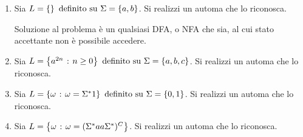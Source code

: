 \documentclass{subfiles}
\begin{document}
\begin{enumerate}
    \item Sia \(L = \Set{} \text{definito su} \Sigma = \Set{a, b}\). Si realizzi un automa che lo riconosca.
          

          \begin{Note*}
              Soluzione al problema è un qualsiasi DFA, o NFA che sia, al cui stato accettante non è possibile accedere.
          \end{Note*}

    \item Sia \(L = \set{a^{2n}}{n \ge 0} \text{definito su} \Sigma = \Set{a, b, c}\). Si realizzi un automa che lo riconosca.
          

    \item Sia \(L = \set{\omega}{\omega = \Sigma^{*}1} \text{definito su} \Sigma = \Set{0, 1}\). Si realizzi un automa che lo riconosca.
          

    \item Sia \(L = \left\{\omega \operatorname{\: {:} \:} \omega = (\Sigma^{*} aa \Sigma^{*})^{C}\right\}\). Si realizzi un automa che lo riconosca.
          
\end{enumerate}
\end{document}
